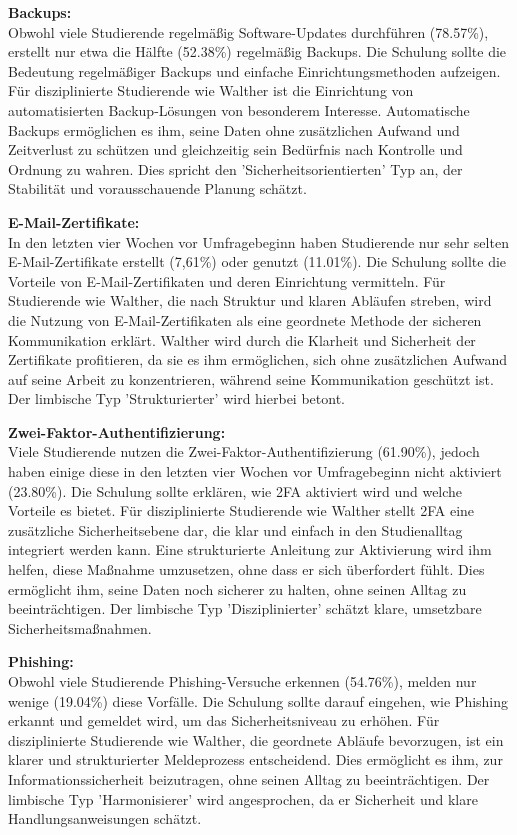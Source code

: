 \documentclass[german,report]{i1thesis}
\begin{document}
\textbf{Backups:}\\
Obwohl viele Studierende regelmäßig Software-Updates durchführen (78.57\%), erstellt nur etwa die Hälfte (52.38\%) regelmäßig Backups. Die Schulung sollte die Bedeutung regelmäßiger Backups und einfache Einrichtungsmethoden aufzeigen. Für disziplinierte Studierende wie Walther ist die Einrichtung von automatisierten Backup-Lösungen von besonderem Interesse. Automatische Backups ermöglichen es ihm, seine Daten ohne zusätzlichen Aufwand und Zeitverlust zu schützen und gleichzeitig sein Bedürfnis nach Kontrolle und Ordnung zu wahren. Dies spricht den 'Sicherheitsorientierten' Typ an, der Stabilität und vorausschauende Planung schätzt.

\textbf{E-Mail-Zertifikate:}\\
In den letzten vier Wochen vor Umfragebeginn haben Studierende nur sehr selten E-Mail-Zertifikate erstellt (7,61\%) oder genutzt (11.01\%). Die Schulung sollte die Vorteile von E-Mail-Zertifikaten und deren Einrichtung vermitteln. Für Studierende wie Walther, die nach Struktur und klaren Abläufen streben, wird die Nutzung von E-Mail-Zertifikaten als eine geordnete Methode der sicheren Kommunikation erklärt. Walther wird durch die Klarheit und Sicherheit der Zertifikate profitieren, da sie es ihm ermöglichen, sich ohne zusätzlichen Aufwand auf seine Arbeit zu konzentrieren, während seine Kommunikation geschützt ist. Der limbische Typ 'Strukturierter' wird hierbei betont.

\textbf{Zwei-Faktor-Authentifizierung:}\\
Viele Studierende nutzen die Zwei-Faktor-Authentifizierung (61.90\%), jedoch haben einige diese in den letzten vier Wochen vor Umfragebeginn nicht aktiviert (23.80\%). Die Schulung sollte erklären, wie 2FA aktiviert wird und welche Vorteile es bietet. Für disziplinierte Studierende wie Walther stellt 2FA eine zusätzliche Sicherheitsebene dar, die klar und einfach in den Studienalltag integriert werden kann. Eine strukturierte Anleitung zur Aktivierung wird ihm helfen, diese Maßnahme umzusetzen, ohne dass er sich überfordert fühlt. Dies ermöglicht ihm, seine Daten noch sicherer zu halten, ohne seinen Alltag zu beeinträchtigen. Der limbische Typ 'Disziplinierter' schätzt klare, umsetzbare Sicherheitsmaßnahmen.

\textbf{Phishing:}\\
Obwohl viele Studierende Phishing-Versuche erkennen (54.76\%), melden nur wenige (19.04\%) diese Vorfälle. Die Schulung sollte darauf eingehen, wie Phishing erkannt und gemeldet wird, um das Sicherheitsniveau zu erhöhen. Für disziplinierte Studierende wie Walther, die geordnete Abläufe bevorzugen, ist ein klarer und strukturierter Meldeprozess entscheidend. Dies ermöglicht es ihm, zur Informationssicherheit beizutragen, ohne seinen Alltag zu beeinträchtigen. Der limbische Typ 'Harmonisierer' wird angesprochen, da er Sicherheit und klare Handlungsanweisungen schätzt.
\end{document}
